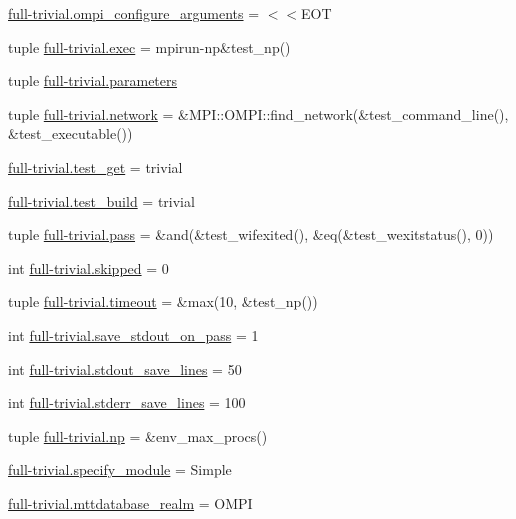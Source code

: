 \begin{DoxyCompactItemize}
\hyperlink{namespacefull-trivial_ad846b3615dd310ecef321a446f558151}{full-\/trivial.\-ompi\-\_\-configure\-\_\-arguments} = $<$$<$E\-O\-T
\item 
tuple \hyperlink{namespacefull-trivial_a96c49e3c0c2dc3c6f9dbf27fe22ff837}{full-\/trivial.\-exec} = mpirun-\/np\&test\-\_\-np()
\item 
tuple \hyperlink{namespacefull-trivial_a6513f5e0f867d0312f10064a0adb1740}{full-\/trivial.\-parameters}
\item 
tuple \hyperlink{namespacefull-trivial_aec768b574435ba99bb3d8737549d08e5}{full-\/trivial.\-network} = \&M\-P\-I\-::\-O\-M\-P\-I\-::find\-\_\-network(\&test\-\_\-command\-\_\-line(), \&test\-\_\-executable())
\item 
\hyperlink{namespacefull-trivial_a3973918af8b0679a239a862cdc097804}{full-\/trivial.\-test\-\_\-get} = trivial
\item 
\hyperlink{namespacefull-trivial_aa09bcc003045dcca018f705fcea70f0f}{full-\/trivial.\-test\-\_\-build} = trivial
\item 
tuple \hyperlink{namespacefull-trivial_a47d8fbeff54aeee0210d2f5d55d4fc75}{full-\/trivial.\-pass} = \&and(\&test\-\_\-wifexited(), \&eq(\&test\-\_\-wexitstatus(), 0))
\item 
int \hyperlink{namespacefull-trivial_a119af101bc6d9cb4061ffea6b4187230}{full-\/trivial.\-skipped} = 0
\item 
tuple \hyperlink{namespacefull-trivial_a87b2271fca0c5c5553c1a20d8ee1c11d}{full-\/trivial.\-timeout} = \&max(10, \&test\-\_\-np())
\item 
int \hyperlink{namespacefull-trivial_a648cfc9aa4be2d29a9b2cc7fa66a99de}{full-\/trivial.\-save\-\_\-stdout\-\_\-on\-\_\-pass} = 1
\item 
int \hyperlink{namespacefull-trivial_a701f09db43ab9e43a49aaf76aa97b131}{full-\/trivial.\-stdout\-\_\-save\-\_\-lines} = 50
\item 
int \hyperlink{namespacefull-trivial_ab88dfbf498ed0d90e1a0510bbbb706fa}{full-\/trivial.\-stderr\-\_\-save\-\_\-lines} = 100
\item 
tuple \hyperlink{namespacefull-trivial_acf328fb05e5f171cd49e3b6930f21f2f}{full-\/trivial.\-np} = \&env\-\_\-max\-\_\-procs()
\item 
\hyperlink{namespacefull-trivial_a8845e5ef8465c334338eba7b42c0c61c}{full-\/trivial.\-specify\-\_\-module} = Simple
\item 
\hyperlink{namespacefull-trivial_a5f93117c210f5de7bd0b75c05ca93072}{full-\/trivial.\-mttdatabase\-\_\-realm} = O\-M\-P\-I
\item 
$$
\end{DoxyCompactItemize}
